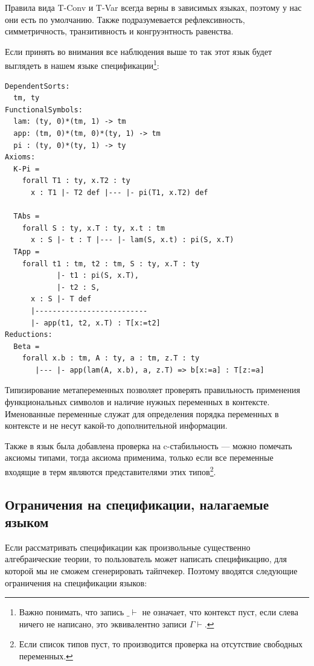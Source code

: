 Правила вида T-Conv и T-Var всегда верны в зависимых языках, поэтому у нас они есть по умолчанию. Также подразумевается рефлексивность, симметричность, транзитивность и конгруэнтность равенства.

Если принять во внимания все наблюдения выше то так этот язык будет выглядеть в нашем языке спецификации\footnote{Важно понимать, что запись $\_ \vdash$ не означает, что контекст пуст, если слева ничего не написано, это эквивалентно записи $\Gamma \vdash$.}:

\begin{lstlisting}[frame=single]
DependentSorts:
  tm, ty
FunctionalSymbols:
  lam: (ty, 0)*(tm, 1) -> tm
  app: (tm, 0)*(tm, 0)*(ty, 1) -> tm
  pi : (ty, 0)*(ty, 1) -> ty
Axioms:
  K-Pi =
    forall T1 : ty, x.T2 : ty
      x : T1 |- T2 def |--- |- pi(T1, x.T2) def

  TAbs =
    forall S : ty, x.T : ty, x.t : tm
      x : S |- t : T |--- |- lam(S, x.t) : pi(S, x.T)
  TApp =
    forall t1 : tm, t2 : tm, S : ty, x.T : ty
            |- t1 : pi(S, x.T),
            |- t2 : S,
      x : S |- T def
      |--------------------------
      |- app(t1, t2, x.T) : T[x:=t2]
Reductions:
  Beta =
    forall x.b : tm, A : ty, a : tm, z.T : ty
       |--- |- app(lam(A, x.b), a, z.T) => b[x:=a] : T[z:=a]

\end{lstlisting}

Типизирование метапеременных позволяет проверять правильность применения функциональных символов и наличие нужных переменных в контексте. Именованные переменные служат для определения порядка переменных в контексте и не несут какой-то дополнительной информации.

Также в язык была добавлена проверка на c-стабильность --- можно помечать аксиомы типами, тогда аксиома применима, только если все переменные входящие в терм являются представителями этих типов\footnote{Если список типов пуст, то производится проверка на отсутствие свободных переменных.}.

\subsection{Ограничения на спецификации, налагаемые языком}

Если рассматривать спецификации как произвольные существенно алгебраические теории, то пользователь может написать спецификацию, для которой мы не сможем сгенерировать тайпчекер. Поэтому вводятся следующие ограничения на спецификации языков:

